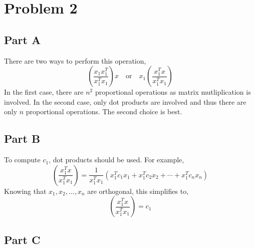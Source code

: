 \documentclass{article}
\begin{document}
\section*{Problem 2}

\subsection*{Part A}

There are two ways to perform this operation,
$$ \left(\frac{x_1 x_1^T}{x_1^T x_1}\right)x \quad \mathrm{or} \quad x_1
\left(\frac{x_1^T x}{x_1^T x_1}\right) $$
In the first case, there are $n^2$ proportional operations as matrix
mutliplication is involved. In the second case, only dot products are
involved and thus there are only $n$ proportional operations. The second
choice is best.

\subsection*{Part B}

To compute $c_1$, dot products should be used. For example,
$$ \left(\frac{x_1^T x}{x_1^T x_1}\right) = \frac{1}{x_1^T x_1} \left(x_1^T
c_1 x_1 + x_1^T c_2 x_2 + \cdots + x_1^T c_n x_n\right)$$
Knowing that $x_1, x_2, \ldots, x_n$ are orthogonal, this simplifies to,
$$ \left(\frac{x_1^T x}{x_1^T x_1}\right) = c_1 $$

\subsection*{Part C}
\end{document}
